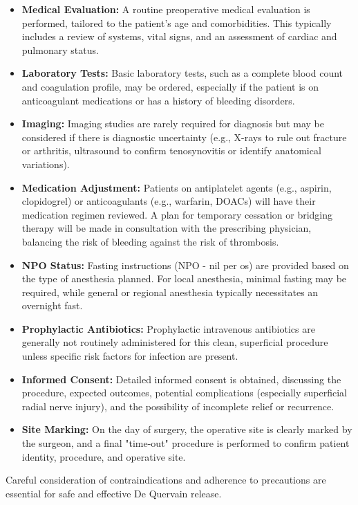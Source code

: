 \begin{itemize}
  \item \textbf{Medical Evaluation:} A routine preoperative medical evaluation is performed, tailored to the patient's age and comorbidities. This typically includes a review of systems, vital signs, and an assessment of cardiac and pulmonary status.
  \item \textbf{Laboratory Tests:} Basic laboratory tests, such as a complete blood count and coagulation profile, may be ordered, especially if the patient is on anticoagulant medications or has a history of bleeding disorders.
  \item \textbf{Imaging:} Imaging studies are rarely required for diagnosis but may be considered if there is diagnostic uncertainty (e.g., X-rays to rule out fracture or arthritis, ultrasound to confirm tenosynovitis or identify anatomical variations).
  \item \textbf{Medication Adjustment:} Patients on antiplatelet agents (e.g., aspirin, clopidogrel) or anticoagulants (e.g., warfarin, DOACs) will have their medication regimen reviewed. A plan for temporary cessation or bridging therapy will be made in consultation with the prescribing physician, balancing the risk of bleeding against the risk of thrombosis.
  \item \textbf{NPO Status:} Fasting instructions (NPO - nil per os) are provided based on the type of anesthesia planned. For local anesthesia, minimal fasting may be required, while general or regional anesthesia typically necessitates an overnight fast.
  \item \textbf{Prophylactic Antibiotics:} Prophylactic intravenous antibiotics are generally not routinely administered for this clean, superficial procedure unless specific risk factors for infection are present.
  \item \textbf{Informed Consent:} Detailed informed consent is obtained, discussing the procedure, expected outcomes, potential complications (especially superficial radial nerve injury), and the possibility of incomplete relief or recurrence.
  \item \textbf{Site Marking:} On the day of surgery, the operative site is clearly marked by the surgeon, and a final "time-out" procedure is performed to confirm patient identity, procedure, and operative site.
\end{itemize}

Careful consideration of contraindications and adherence to precautions are essential for safe and effective De Quervain release.

